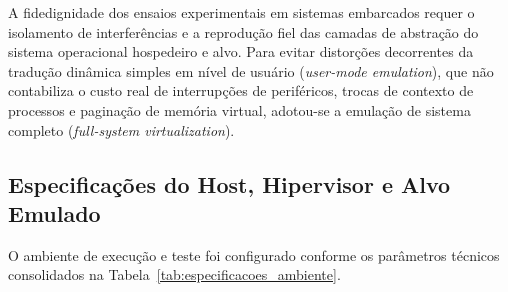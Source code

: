 A fidedignidade dos ensaios experimentais em sistemas embarcados requer o isolamento de interferências e a reprodução fiel das camadas de abstração do sistema operacional hospedeiro e alvo. Para evitar distorções decorrentes da tradução dinâmica simples em nível de usuário (\textit{user-mode emulation}), que não contabiliza o custo real de interrupções de periféricos, trocas de contexto de processos e paginação de memória virtual, adotou-se a emulação de sistema completo (\textit{full-system virtualization}).

\subsection{Especificações do Host, Hipervisor e Alvo Emulado}
\label{subsec:especificacoes_host_guest}

O ambiente de execução e teste foi configurado conforme os parâmetros técnicos consolidados na Tabela~\ref{tab:especificacoes_ambiente}.

